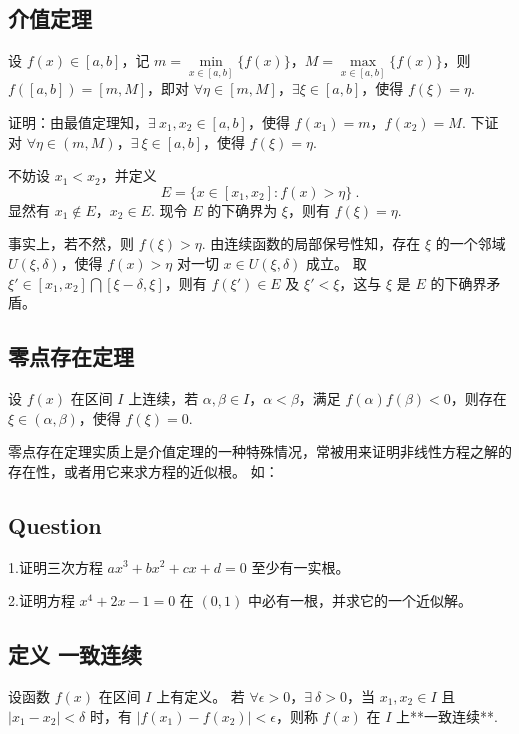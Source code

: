 \subsection{介值定理}\label{sub_conff_4}

  设 $f(x)\in [a,b]$，记 $m=\min\limits_{x\in[a,b]}\{f(x)\}$，$M=\max\limits_{x\in[a,b]}\{f(x)\}$，则 $f([a,b])=[m,M]$，即对 $\forall \eta\in[m,M]$，$\exists \xi\in[a,b]$，使得 $f(\xi)=\eta$.

  证明：由最值定理知，$\exists\ x_1,x_2\in[a,b]$，使得 $f(x_1)=m$，$f(x_2)=M$. 下证对 $\forall \eta\in (m,M)$，$\exists\  \xi\in[a,b]$，使得 $f(\xi)=\eta$.

  不妨设 $x_1<x_2$，并定义
  $$
  E=\{x\in[x_1,x_2]:f(x)>\eta\}~.
  $$
  显然有 $x_1\notin E$，$x_2\in E$. 现令 $E$ 的下确界为 $\xi$，则有 $f(\xi)=\eta$.

  事实上，若不然，则 $f(\xi)>\eta$. 由连续函数的局部保号性知，存在 $\xi$ 的一个邻域 $U(\xi,\delta)$，使得 $f(x)>\eta$ 对一切 $x\in U(\xi,\delta)$ 成立。 取 $\xi'\in[x_1,x_2]\bigcap [\xi-\delta,\xi]$，则有 $f(\xi')\in E$ 及 $\xi'<\xi$，这与 $\xi$ 是 $E$ 的下确界矛盾。

\subsection{零点存在定理}

  设 $f(x)$ 在区间 $I$ 上连续，若 $\alpha,\beta\in I$，$\alpha<\beta$，满足 $f(\alpha)f(\beta)<0$，则存在 $\xi\in(\alpha,\beta)$，使得 $f(\xi)=0$.

  零点存在定理实质上是介值定理的一种特殊情况，常被用来证明非线性方程之解的存在性，或者用它来求方程的近似根。 如：

\subsection{Question}

  1.证明三次方程 $ax^3+bx^2+cx+d=0$ 至少有一实根。

  2.证明方程 $x^4+2x-1=0$ 在 $(0,1)$ 中必有一根，并求它的一个近似解。

\subsection{定义  一致连续}\label{sub_conff_2}

  设函数 $f(x)$ 在区间 $I$ 上有定义。  若 $\forall \epsilon>0$，$\exists\ \delta>0$，当 $x_1,x_2\in I$ 且 $\vert x_1-x_2\vert<\delta$ 时，有 $\vert f(x_1)-f(x_2)\vert<\epsilon$，则称 $f(x)$ 在 $I$ 上**一致连续**. 

